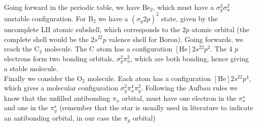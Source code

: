 \documentclass[../qm.tex]{subfiles}
\begin{document}
	Going forward in the periodic table, we have $\mathrm{Be}_2$, which must have a $\sigma_g^2\sigma_u^2$ unstable configuration. For $\mathrm{B}_2$ we have a $\left( \sigma_g 2p \right)^2$ state, given by the uncomplete LII atomic subshell, which corresponds to the $2p$ atomic orbital (the complete shell would be the $2s^22p$ valence shell for Boron). Going forwards, we reach the $\mathrm{C}_2$ molecule. The $\mathrm{C}$ atom has a configuration $[\mathrm{He}]2s^22p^2$. The 4 $p$ electrons form two bonding orbitals, $\sigma_g^2\pi_u^2$, which are both bonding, hence giving a stable molecule.\\
	Finally we consider the $\mathrm{O}_2$ molecule. Each atom has a configuration $[\mathrm{He}]2s^22p^4$, which gives a molecular configuration $\sigma_g^2\pi_u^4\pi_g^2$. Following the Aufbau rules we know that the unfilled antibonding $\pi_u$ orbital, must have one electron in the $\pi_x^{\star}$ and one in the $\pi_y^{\star}$ (remember that the star is usually used in literature to indicate an antibonding orbital, in our case the $\pi_g$ orbital)\\
\end{document}
